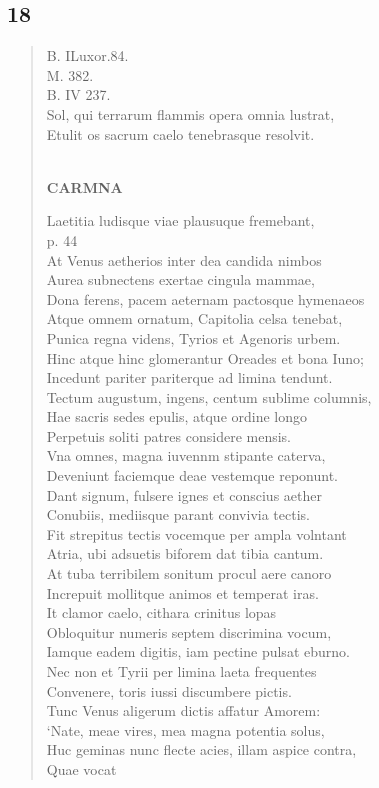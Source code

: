 \documentclass[11pt, a4paper]{report}
\begin{document}
            \subsection*{18}
      \begin{verse}
      B. ILuxor.84. \\ M. 382. \\ B. IV 237. \\ Sol, qui terrarum flammis opera omnia lustrat, \\ Etulit os sacrum caelo tenebrasque resolvit. \\ 
        ﻿\pagebreak 
    \begin{center} \textbf{CARMNA} \end{center} \marginpar{[80]} Laetitia ludisque viae plausuque fremebant, \\ p. 44 \\ At Venus aetherios inter dea candida nimbos \\ Aurea subnectens exertae cingula mammae, \\ Dona ferens, pacem aeternam pactosque hymenaeos \\ Atque omnem ornatum, Capitolia celsa tenebat, \\ Punica regna videns, Tyrios et Agenoris urbem. \\ Hinc atque hinc glomerantur Oreades et bona Iuno; \\ Incedunt pariter pariterque ad limina tendunt. \\ Tectum augustum, ingens, centum sublime columnis, \\ Hae sacris sedes epulis, atque ordine longo \\ Perpetuis soliti patres considere mensis. \\ Vna omnes, magna iuvennm stipante caterva, \\ Deveniunt faciemque deae vestemque reponunt. \\ Dant signum, fulsere ignes et conscius aether \\ Conubiis, mediisque parant convivia tectis. \\ Fit strepitus tectis vocemque per ampla volntant \\ Atria, ubi adsuetis biforem dat tibia cantum. \\ At tuba terribilem sonitum procul aere canoro \\ Increpuit mollitque animos et temperat iras. \\ It clamor caelo, cithara crinitus lopas \\ Obloquitur numeris septem discrimina vocum, \\ Iamque eadem digitis, iam pectine pulsat eburno. \\ Nec non et Tyrii per limina laeta frequentes \\ Convenere, toris iussi discumbere pictis. \\ Tunc Venus aligerum dictis affatur Amorem: \\ ‘Nate, meae vires, mea magna potentia solus, \\ Huc geminas nunc flecte acies, illam aspice contra, \\ Quae vocat 
\end{verse}
\end{document}
